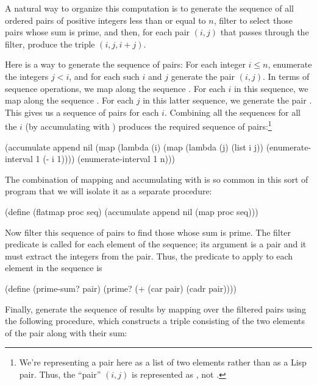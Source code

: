 A natural way to organize this computation is to generate the sequence of all
ordered pairs of positive integers less than or equal to \( n \), filter to
select those pairs whose sum is prime, and then, for each pair \( (i, j) \)
that passes through the filter, produce the triple \( (i, j, i + j) \).

Here is a way to generate the sequence of pairs: For each integer \( i \le n \),
enumerate the integers \( j < i \), and for each such \( i \) and \( j \)
generate the pair \( (i, j) \).  In terms of sequence operations, we map along
the sequence .  For each \( i \) in this sequence,
we map along the sequence .  For each
\( j \) in this latter sequence, we generate the pair .  This
gives us a sequence of pairs for each \( i \).  Combining all the sequences for
all the \( i \) (by accumulating with ) produces the required
sequence of pairs:\footnote{We're representing a pair here as a list of two
elements rather than as a Lisp pair.  Thus, the ``pair'' \( (i, j) \) is
represented as , not .}

\begin{codeBlock}
(accumulate
 append nil (map (lambda (i)
                   (map (lambda (j) (list i j))
                        (enumerate-interval 1
                                            (- i 1))))
                 (enumerate-interval 1 n)))
\end{codeBlock}

\noindent
The combination of mapping and accumulating with  is so common in
this sort of program that we will isolate it as a separate procedure:

\begin{codeBlock}
(define (flatmap proc seq)
  (accumulate append nil (map proc seq)))
\end{codeBlock}

\noindent
Now filter this sequence of pairs to find those whose sum is prime. The filter
predicate is called for each element of the sequence; its argument is a pair
and it must extract the integers from the pair.  Thus, the predicate to apply
to each element in the sequence is

\begin{codeBlock}
(define (prime-sum? pair)
  (prime? (+ (car pair) (cadr pair))))
\end{codeBlock}

\noindent
Finally, generate the sequence of results by mapping over the filtered pairs
using the following procedure, which constructs a triple consisting of the two
elements of the pair along with their sum:

